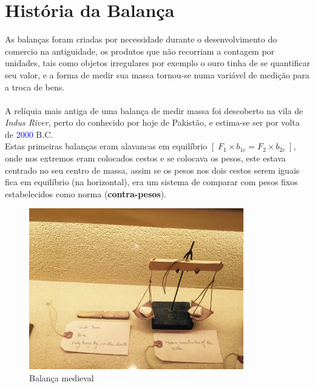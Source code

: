 \chapter{História da Balança}
As balanças foram criadas por necessidade durante o desenvolvimento do comercio na antiguidade, os produtos que não recorriam a contagem por unidades, tais como objetos irregulares por exemplo o ouro tinha de se quantificar seu valor, e a forma de medir sua massa tornou-se numa variável de medição para a troca de bens.
\\
\\
A relíquia mais antiga de uma balança de medir massa foi descoberto na vila de \textit{Indus River}, perto do conhecido por hoje de Pakistão, e estima-se ser por volta de \textcolor{blue}{2000} B.C.
\\
Estas primeiras balanças eram alavancas em equilíbrio $[ \; F_{1} \times b_{1c} = F_{2} \times b_{2c} \; ]$, onde nos extremos eram colocados cestos e se colocava os pesos, este estava centrado no seu centro de massa, assim se os pesos nos dois cestos serem iguais fica em equilíbrio (na horizontal), era um sistema de comparar com pesos fixos estabelecidos como norma (\textbf{contra-pesos}).
\\
\begin{minipage}[!b]{0.45\linewidth}
	\begin{figure}[H]
		\centering
		\includegraphics[height=7cm]{./image/PESTA/general/balanca_1.jpg}
		\caption{Balança medieval}
		\label{balanca_1}
	\end{figure}
\end{minipage}
\hspace{2.2cm}
